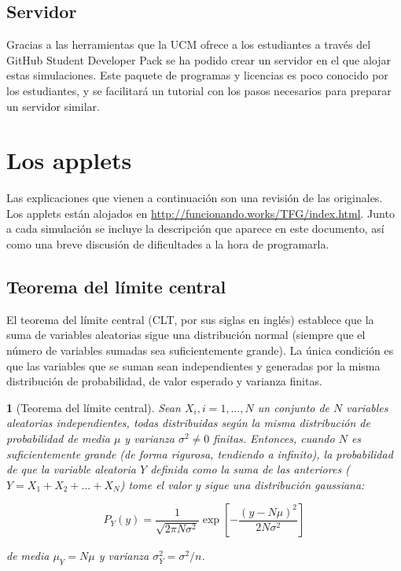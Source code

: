 \documentclass[11pt, a4paper]{article} %
\theoremstyle{named}
\newtheorem*{namedtheorem}{}
\begin{document}
\subsection{Servidor}

Gracias a las herramientas que la UCM ofrece a los estudiantes a través del GitHub Student Developer Pack se ha podido crear un servidor en el que alojar estas simulaciones. Este paquete de programas y licencias es poco conocido por los estudiantes, y se facilitará un tutorial con los pasos necesarios para preparar un servidor similar.

\newpage

\section{Los applets}\label{sec:apps}


Las explicaciones que vienen a continuación son una revisión de las originales. Los applets están alojados en \url{http://funcionando.works/TFG/index.html}.
Junto a cada simulación se incluye la descripción que aparece en este documento, así como una breve discusión de dificultades a la hora de programarla.
\subsection{Teorema del límite central}\label{sec:central}

El teorema del límite central (CLT, por sus siglas en inglés) establece que la suma de variables aleatorias sigue una distribución normal \cite{dorfman} (siempre que el número de variables sumadas sea suficientemente grande). La única condición es que las variables que se suman sean independientes y generadas por la misma distribución de probabilidad, de valor esperado y varianza finitas.

\begin{namedtheorem}[Teorema del límite central]
Sean $X_i, i = 1,\dots, N$ un conjunto de $N$ variables aleatorias independientes, todas distribuidas según la misma distribución de probabilidad de media $\mu$ y varianza $\sigma^2 \neq 0$ finitas.
Entonces, cuando $N$ es suficientemente grande (de forma rigurosa, tendiendo a infinito), la probabilidad de que la variable aleatoria $Y$ definida como la suma de las anteriores ($Y = X_1 + X_2 + \dots + X_N$) tome el valor $y$ sigue una distribución gaussiana:

\begin{equation}\label{eq:Gauss}
P_{Y}(y)=\frac{1}{\sqrt{2 \pi N \sigma^{2}}} \exp \left[-\frac{(y-N \mu)^{2}}{2 N \sigma^{2}}\right]
\end{equation}

de media $\mu_Y = N \mu$ y varianza $\sigma_Y^2 = \sigma^2/n$.
\end{namedtheorem}
\end{document}
